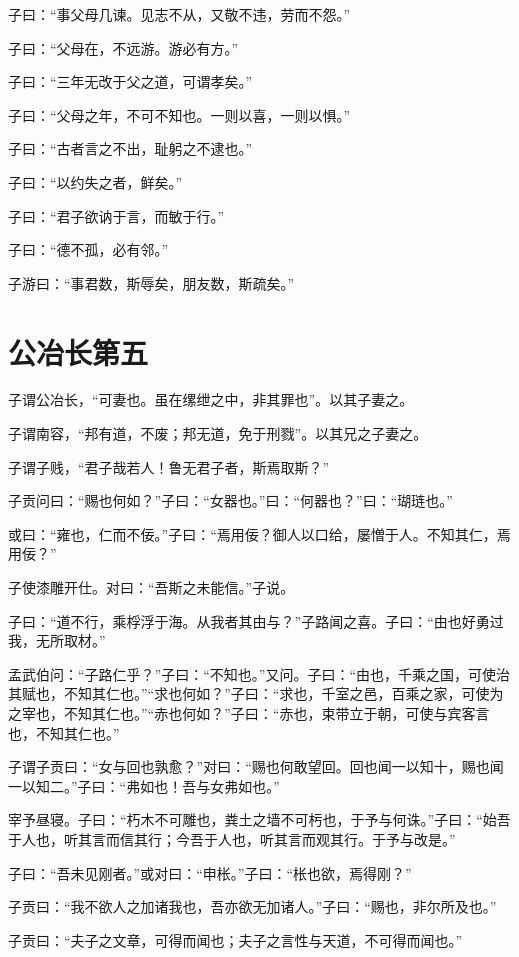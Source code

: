 \documentclass[twoside,openany]{book}
\begin{document}
子曰：“事父母几谏。见志不从，又敬不违，劳而不怨。”

子曰：“父母在，不远游。游必有方。”

子曰：“三年无改于父之道，可谓孝矣。”

子曰：“父母之年，不可不知也。一则以喜，一则以惧。”

子曰：“古者言之不出，耻躬之不逮也。”

子曰：“以约失之者，鲜矣。”

子曰：“君子欲讷于言，而敏于行。”

子曰：“德不孤，必有邻。”

子游曰：“事君数，斯辱矣，朋友数，斯疏矣。” 

\chapter{公冶长第五}\label{ch5}

子谓公冶长，“可妻也。虽在缧绁之中，非其罪也”。以其子妻之。

子谓南容，“邦有道，不废；邦无道，免于刑戮”。以其兄之子妻之。

子谓子贱，“君子哉若人！鲁无君子者，斯焉取斯？”

子贡问曰：“赐也何如？”子曰：“女器也。”曰：“何器也？”曰：“瑚琏也。”

或曰：“雍也，仁而不佞。”子曰：“焉用佞？御人以口给，屡憎于人。不知其仁，焉用佞？”

子使漆雕开仕。对曰：“吾斯之未能信。”子说。

子曰：“道不行，乘桴浮于海。从我者其由与？”子路闻之喜。子曰：“由也好勇过我，无所取材。”

孟武伯问：“子路仁乎？”子曰：“不知也。”又问。子曰：“由也，千乘之国，可使治其赋也，不知其仁也。”“求也何如？”子曰：“求也，千室之邑，百乘之家，可使为之宰也，不知其仁也。”“赤也何如？”子曰：“赤也，束带立于朝，可使与宾客言也，不知其仁也。”

子谓子贡曰：“女与回也孰愈？”对曰：“赐也何敢望回。回也闻一以知十，赐也闻一以知二。”子曰：“弗如也！吾与女弗如也。”

宰予昼寝。子曰：“朽木不可雕也，粪土之墙不可杇也，于予与何诛。”子曰：“始吾于人也，听其言而信其行；今吾于人也，听其言而观其行。于予与改是。”

子曰：“吾未见刚者。”或对曰：“申枨。”子曰：“枨也欲，焉得刚？”

子贡曰：“我不欲人之加诸我也，吾亦欲无加诸人。”子曰：“赐也，非尔所及也。”

子贡曰：“夫子之文章，可得而闻也；夫子之言性与天道，不可得而闻也。”
\end{document}
